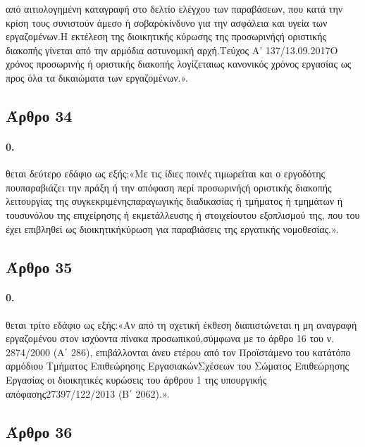 \documentclass[a4paper,oneside, 10pt]{book}
\begin{document}
από αιτιολογημένη καταγραφή στο δελτίο ελέγχου των παραβάσεων, που κατά την κρίση τους συνιστούν άμεσο ή σοβαρόκίνδυνο για την ασφάλεια και υγεία των εργαζομένων.Η εκτέλεση της διοικητικής κύρωσης της προσωρινήςή οριστικής διακοπής γίνεται από την αρμόδια αστυνομική αρχή.Τεύχος Α’ 137/13.09.2017Ο χρόνος προσωρινής ή οριστικής διακοπής λογίζεταιως κανονικός χρόνος εργασίας ως προς όλα τα δικαιώματα των εργαζομένων.».
\subsection*{ Άρθρο 34 }
\paragraph { 0. } θεται δεύτερο εδάφιο ως εξής:«Με τις ίδιες ποινές τιμωρείται και ο εργοδότης πουπαραβιάζει την πράξη ή την απόφαση περί προσωρινήςή οριστικής διακοπής λειτουργίας της συγκεκριμένηςπαραγωγικής διαδικασίας ή τμήματος ή τμημάτων ή τουσυνόλου της επιχείρησης ή εκμετάλλευσης ή στοιχείουτου εξοπλισμού της, που του έχει επιβληθεί ως διοικητικήκύρωση για παραβιάσεις της εργατικής νομοθεσίας.».
\subsection*{ Άρθρο 35 }
\paragraph { 0. } θεται τρίτο εδάφιο ως εξής:«Αν από τη σχετική έκθεση διαπιστώνεται η μη αναγραφή εργαζομένου στον ισχύοντα πίνακα προσωπικού,σύμφωνα με το άρθρο 16 του ν. 2874/2000 (Α΄ 286), επιβάλλονται άνευ ετέρου από τον Προϊστάμενο του κατάτόπο αρμόδιου Τμήματος Επιθεώρησης ΕργασιακώνΣχέσεων του Σώματος Επιθεώρησης Εργασίας οι διοικητικές κυρώσεις του άρθρου 1 της υπουργικής απόφασης27397/122/2013 (B΄ 2062).».
\subsection*{ Άρθρο 36 }
\end{document}
